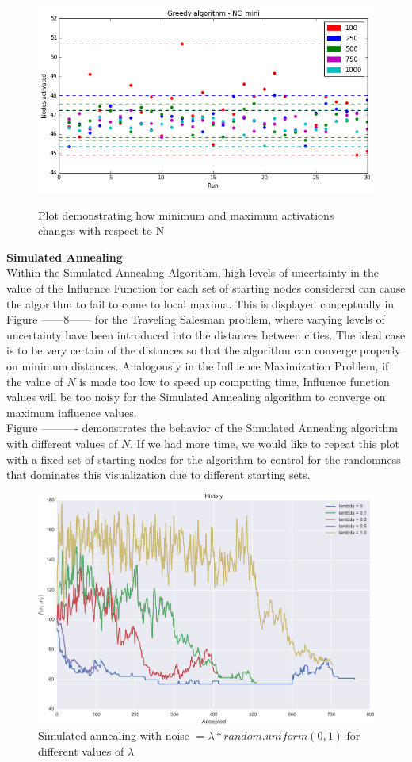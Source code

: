 \documentclass[11pt]{scrartcl} %
\begin{document}
\begin{enumerate}
\begin{figure}[h!]
\centering
\includegraphics[width=10 cm]{greedy_min}
\label{fig_sim}
\caption{Plot demonstrating how minimum and maximum activations changes with respect to N}
\label{fig:GA}
\end{figure}


\textbf{Simulated Annealing}\\

Within the Simulated Annealing Algorithm, high levels of uncertainty in the value of the Influence Function for each set of starting nodes considered can cause the algorithm to fail to come to local maxima.  This is displayed conceptually in Figure ------8------ for the Traveling Salesman problem, where varying levels of uncertainty have been introduced into the distances between cities.  The ideal case is to be very certain of the distances so that the algorithm can converge properly on minimum distances.  Analogously in the Influence Maximization Problem, if the value of $N$ is made too low to speed up computing time, Influence function values will be too noisy for the Simulated Annealing algorithm to converge on maximum influence values.  \\
Figure ---------- demonstrates the behavior of the Simulated Annealing algorithm with different values of $N$.  If we had more time, we would like to repeat this plot with a fixed set of starting nodes for the algorithm to control for the randomness that dominates this visualization due to different starting sets.  
\begin{figure}
\centering
\includegraphics[width=10 cm]{lambda01}
\caption{Simulated annealing with noise $= \lambda*random.uniform(0,1)$ for different values of $\lambda$}
\label{fig:SA}
\end{figure}



\end{enumerate}
\end{document}

